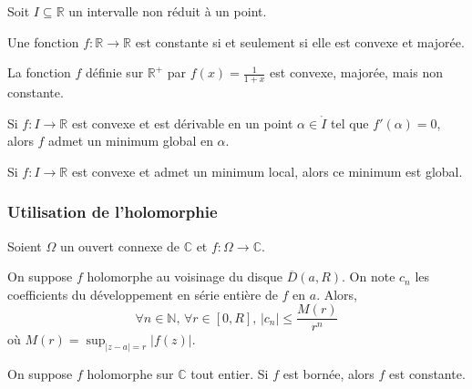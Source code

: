 
	Soit $I \subseteq \mathbb{R}$ un intervalle non réduit à un point.

	\begin{proposition}
		Une fonction $f : \mathbb{R} \rightarrow \mathbb{R}$ est constante si et seulement si elle est convexe et majorée.
	\end{proposition}

	\begin{cexample}
		La fonction $f$ définie sur $\mathbb{R}^+$ par $f(x) = \frac{1}{1+x}$ est convexe, majorée, mais non constante.
	\end{cexample}

	\begin{proposition}
		Si $f : I \rightarrow \mathbb{R}$ est convexe et est dérivable en un point $\alpha \in \mathring{I}$ tel que $f'(\alpha) = 0$, alors $f$ admet un minimum global en $\alpha$.
	\end{proposition}

	\begin{proposition}
		Si $f : I \rightarrow \mathbb{R}$ est convexe et admet un minimum local, alors ce minimum est global.
	\end{proposition}

	\subsubsection{Utilisation de l'holomorphie}


	Soient $\Omega$ un ouvert connexe de $\mathbb{C}$ et $f : \Omega \rightarrow \mathbb{C}$.

	\begin{proposition}
		On suppose $f$ holomorphe au voisinage du disque $\overline{D}(a,R)$. On note $c_n$ les coefficients du développement en série entière de $f$ en $a$. Alors,
		\[ \forall n \in \mathbb{N}, \, \forall r \in [0,R], \, \vert c_n \vert \leq \frac{M(r)}{r^n} \]
		où $M(r) = \sup_{\vert z-a \vert = r} \vert f(z) \vert$.
	\end{proposition}

	\begin{corollary}
		On suppose $f$ holomorphe sur $\mathbb{C}$ tout entier. Si $f$ est bornée, alors $f$ est constante.
	\end{corollary}


